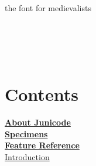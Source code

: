 \documentclass[12pt,letterpaper,openany]{book}
\newcounter{Feature}
\begin{document}
\begin{titlepage}
\huge\noindent
{\color{myRed}}\\[5cm]
\Huge {} \\[1cm]
\huge \centering the font for medievalists \\[1cm]
 \Huge{} \\[1cm]
 \huge{} \\[1ex]
 \Large{}\\
\vfill
{\color{myRed}}
\end{titlepage}
\mainmatter

\chapter*{\color{RViolet}Contents}
\thispagestyle{plain}

\noindent\hyperlink{aboutj}{\bfseries\large About Junicode}\\

\noindent\hyperlink{specimens}{\bfseries\large Specimens}\\

\noindent\hyperlink{FeatureReference}{\bfseries\large Feature Reference}\\

\hyperlink{intro}{Introduction}
\end{document}
